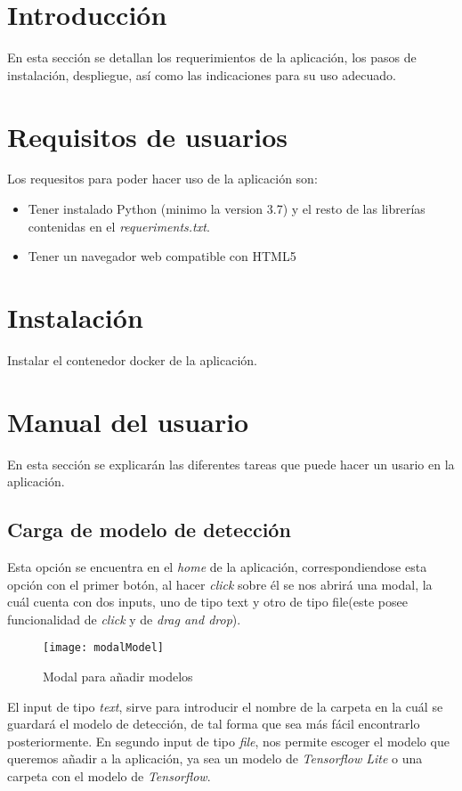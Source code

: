 
\section{Introducción}
En esta sección se detallan los requerimientos de la aplicación, los pasos de instalación, despliegue, así como las indicaciones para su uso adecuado.
\section{Requisitos de usuarios}
Los requesitos para poder hacer uso de la aplicación son:
\begin{itemize}
    \item Tener instalado Python (minimo la version 3.7) y el resto de las librerías contenidas en el \textit{requeriments.txt}.
    \item Tener un navegador web compatible con HTML5 
\end{itemize}

\section{Instalación}
Instalar el contenedor docker de la aplicación.

\section{Manual del usuario}
En esta sección se explicarán las diferentes tareas que puede hacer un usario en la aplicación.
\subsection{Carga de modelo de detección}
Esta opción se encuentra en el \textit{home} de la aplicación, correspondiendose esta opción con el primer botón, al hacer \textit{click} sobre él se nos abrirá una modal, la cuál cuenta con dos inputs, uno de tipo text y otro de tipo file(este posee funcionalidad de \textit{click} y de \textit{drag and drop}).
\begin{figure}[!h]
    \centering
    \texttt{[image: modalModel]}
    \caption{Modal para añadir modelos}\label{fig:modalModel}
\end{figure}

El input de tipo \textit{text}, sirve para introducir el nombre de la carpeta en la cuál se guardará el modelo de detección, de tal forma que sea más fácil encontrarlo posteriormente.
En segundo input de tipo \textit{file}, nos permite escoger el modelo que queremos añadir a la aplicación, ya sea un modelo de \textit{Tensorflow Lite} o una carpeta con el modelo de \textit{Tensorflow}.

